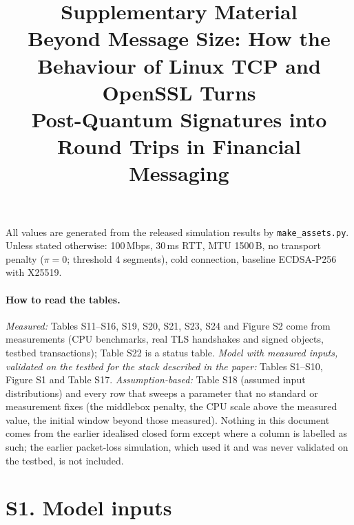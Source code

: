 \documentclass[11pt]{article}
\title{Supplementary Material\\[2mm]\large Beyond Message Size: How the Behaviour of Linux TCP and OpenSSL Turns\\ Post-Quantum Signatures into Round Trips in Financial Messaging}
\date{}
\begin{document}
\maketitle
All values are generated from the released simulation results by \texttt{make\_assets.py}. Unless stated otherwise: 100\,Mbps, 30\,ms RTT, MTU 1500\,B, no transport penalty ($\pi=0$; threshold 4 segments), cold connection, baseline ECDSA-P256 with X25519.

\paragraph{How to read the tables.} \emph{Measured:} Tables S11--S16, S19, S20, S21, S23, S24 and Figure S2 come from measurements (CPU benchmarks, real TLS handshakes and signed objects, testbed transactions); Table S22 is a status table. \emph{Model with measured inputs, validated on the testbed for the stack described in the paper:} Tables S1--S10, Figure S1 and Table S17. \emph{Assumption-based:} Table S18 (assumed input distributions) and every row that sweeps a parameter that no standard or measurement fixes (the middlebox penalty, the CPU scale above the measured value, the initial window beyond those measured). Nothing in this document comes from the earlier idealised closed form except where a column is labelled as such; the earlier packet-loss simulation, which used it and was never validated on the testbed, is not included.

\section*{S1. Model inputs}
\begin{table}[!htbp]\centering\small
\caption{Financial protocol profiles. $^{a}$Algorithm-independent bytes summed over all exchanges. $d_\text{ref}$: reference chain depth.}
\resizebox{\textwidth}{!}{}
\end{table}
\end{document}
